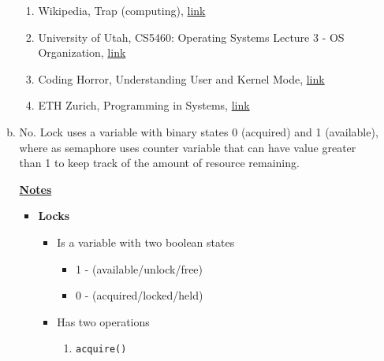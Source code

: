 \documentclass[12pt]{article}
\begin{document}
\begin{enumerate}[1.]
\begin{enumerate}[a)]
        \begin{enumerate}[1)]
            \item Wikipedia, Trap (computing), \href{https://en.wikipedia.org/wiki/Trap_(computing)#:~:text=In%20computing%20and%20operating%20systems,zero%2C%20invalid%20memory%20access).}{link}
            \item University of Utah, CS5460: Operating Systems Lecture 3 - OS Organization, \href{https://my.eng.utah.edu/~cs5460/slides/Lecture03.pdf}{link}
            \item Coding Horror, Understanding User and Kernel Mode, \href{https://blog.codinghorror.com/understanding-user-and-kernel-mode/}{link}
            \item ETH Zurich, Programming in Systems, \href{link}{link}
        \end{enumerate}

        \item

        No. Lock uses a variable with binary states 0 (acquired) and 1 (available), where as
        semaphore uses counter variable that can have value greater than 1 to
        keep track of the amount of resource remaining.

        \bigskip

        \underline{\textbf{Notes}}

        \begin{itemize}
            \item \textbf{Locks}

            \begin{itemize}
                \item Is a variable with two boolean states

                \begin{itemize}
                    \item 1 - (available/unlock/free)
                    \item 0 - (acquired/locked/held)
                \end{itemize}

                \item Has two operations

                \begin{enumerate}[1.]
                    \item \texttt{acquire()}

                    \bigskip


\end{enumerate}
\end{itemize}
\end{itemize}
\end{enumerate}
\end{enumerate}
\end{document}
